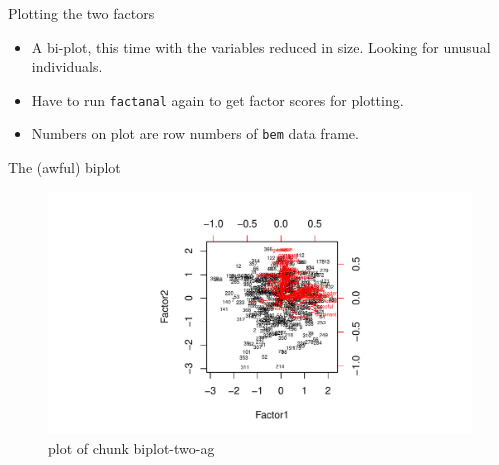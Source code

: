 \documentclass[ignorenonframetext,]{beamer}
\newenvironment{Shaded}{\begin{snugshade}}{\end{snugshade}}
\newcommand{\DataTypeTok}[1]{\textcolor[rgb]{0.13,0.29,0.53}{#1}}
\newcommand{\DecValTok}[1]{\textcolor[rgb]{0.00,0.00,0.81}{#1}}
\newcommand{\FloatTok}[1]{\textcolor[rgb]{0.00,0.00,0.81}{#1}}
\newcommand{\KeywordTok}[1]{\textcolor[rgb]{0.13,0.29,0.53}{\textbf{#1}}}
\newcommand{\NormalTok}[1]{#1}
\newcommand{\OperatorTok}[1]{\textcolor[rgb]{0.81,0.36,0.00}{\textbf{#1}}}
\newcommand{\StringTok}[1]{\textcolor[rgb]{0.31,0.60,0.02}{#1}}
\providecommand{\tightlist}{%
  \setlength{\itemsep}{0pt}\setlength{\parskip}{0pt}}
\begin{document}
\begin{frame}[fragile]{Plotting the two factors}
\protect\hypertarget{plotting-the-two-factors}{}

\begin{itemize}
\item
  A bi-plot, this time with the variables reduced in size. Looking for
  unusual individuals.
\item
  Have to run \texttt{factanal} again to get factor scores for plotting.
\end{itemize}

\begin{Shaded}
\end{Shaded}

\begin{itemize}
\tightlist
\item
  Numbers on plot are row numbers of \texttt{bem} data frame.
\end{itemize}

\end{frame}

\begin{frame}{The (awful) biplot}
\protect\hypertarget{the-awful-biplot}{}

\begin{figure}
\centering
\includegraphics{figure/biplot-two-ag-1.pdf}
\caption{plot of chunk biplot-two-ag}
\end{figure}

\end{frame}
\end{document}
